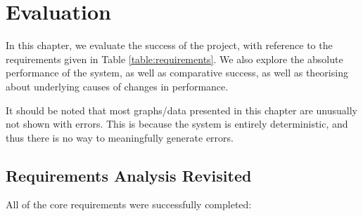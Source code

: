 \documentclass[oneside, class=book, 12pt, crop=false]{standalone}
\begin{document}
\ifstandalone
  \setcounter{chapter}{3}
  \chapter{Evaluation}
\fi
{}

In this chapter, we evaluate the success of the project, with reference to the requirements given in Table \ref{table:requirements}. We also explore the absolute performance of the system, as well as comparative success, as well as theorising about underlying causes of changes in performance. 

It should be noted that most graphs/data presented in this chapter are unusually not shown with errors. This is because the system is entirely deterministic, and thus there is no way to meaningfully generate errors.

\section{Requirements Analysis Revisited}

All of the core requirements were successfully completed:
\end{document}
